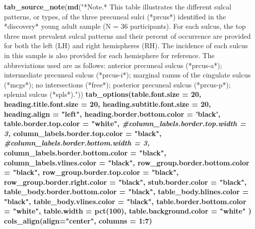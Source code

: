 \documentclass[
]{article}
\newenvironment{Shaded}{\begin{snugshade}}{\end{snugshade}}
\newcommand{\CommentTok}[1]{\textcolor[rgb]{0.56,0.35,0.01}{\textit{#1}}}
\newcommand{\DataTypeTok}[1]{\textcolor[rgb]{0.13,0.29,0.53}{#1}}
\newcommand{\DecValTok}[1]{\textcolor[rgb]{0.00,0.00,0.81}{#1}}
\newcommand{\KeywordTok}[1]{\textcolor[rgb]{0.13,0.29,0.53}{\textbf{#1}}}
\newcommand{\NormalTok}[1]{#1}
\newcommand{\OperatorTok}[1]{\textcolor[rgb]{0.81,0.36,0.00}{\textbf{#1}}}
\newcommand{\StringTok}[1]{\textcolor[rgb]{0.31,0.60,0.02}{#1}}
\begin{document}
\begin{Shaded}
\begin{Highlighting}[]
{{{{{{{{{\KeywordTok{tab_source_note}\NormalTok{(}\KeywordTok{md}\NormalTok{(}\StringTok{"*Note.* This table illustrates the different sulcal patterns, or types, of the three precuneal sulci (*prcus*) identified in the *discovery* young adult sample (N = 36 participants). For each sulcus, the top three most prevalent sulcal patterns and their percent of occurrence are provided for both the left (LH) and right hemispheres (RH). The incidence of each sulcus in this sample is also provided for each hemisphere for reference. The abbreviations used are as follows: anterior precuneal sulcus (*prcus-a*); intermediate precuneal sulcus (*prcus-i*); marginal ramus of the cingulate sulcus (*mcgs*); no intersections (*free*); posterior precuneal sulcus (*prcus-p*); splenial sulcus (*spls*)."}\NormalTok{)) }\OperatorTok{%>%}
\StringTok{  }\KeywordTok{tab_options}\NormalTok{(}\DataTypeTok{table.font.size =} \DecValTok{20}\NormalTok{,}
    \DataTypeTok{heading.title.font.size =} \DecValTok{20}\NormalTok{,}
    \DataTypeTok{heading.subtitle.font.size =} \DecValTok{20}\NormalTok{,}
    \DataTypeTok{heading.align =} \StringTok{"left"}\NormalTok{,}
    \DataTypeTok{heading.border.bottom.color =} \StringTok{'black'}\NormalTok{,}
    \DataTypeTok{table.border.top.color =} \StringTok{"white"}\NormalTok{,}
    \CommentTok{#column_labels.border.top.width = 3,}
    \DataTypeTok{column_labels.border.top.color =} \StringTok{"black"}\NormalTok{,}
    \CommentTok{#column_labels.border.bottom.width = 3,}
    \DataTypeTok{column_labels.border.bottom.color =} \StringTok{"black"}\NormalTok{,}
    \DataTypeTok{column_labels.vlines.color =} \StringTok{"black"}\NormalTok{,}
    \DataTypeTok{row_group.border.bottom.color =} \StringTok{"black"}\NormalTok{,}
    \DataTypeTok{row_group.border.top.color =} \StringTok{"black"}\NormalTok{,}
    \DataTypeTok{row_group.border.right.color =} \StringTok{"black"}\NormalTok{,}
    \DataTypeTok{stub.border.color =} \StringTok{"black"}\NormalTok{,}
    \DataTypeTok{table_body.border.bottom.color =} \StringTok{"black"}\NormalTok{,}
    \DataTypeTok{table_body.hlines.color =} \StringTok{"black"}\NormalTok{,}
    \DataTypeTok{table_body.vlines.color =} \StringTok{"black"}\NormalTok{,}
    \DataTypeTok{table.border.bottom.color =} \StringTok{"white"}\NormalTok{,}
    \DataTypeTok{table.width =} \KeywordTok{pct}\NormalTok{(}\DecValTok{100}\NormalTok{),}
    \DataTypeTok{table.background.color =} \StringTok{"white"}
\NormalTok{  ) }\OperatorTok{%>%}
\StringTok{  }\KeywordTok{cols_align}\NormalTok{(}\DataTypeTok{align=}\StringTok{"center"}\NormalTok{, }\DataTypeTok{columns =} \DecValTok{1}\OperatorTok{:}\DecValTok{7}\NormalTok{) }\OperatorTok{%>%}
}}}}}}}}}}}}
\end{Highlighting}
\end{Shaded}
\end{document}
